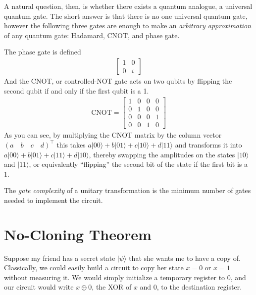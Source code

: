 \documentclass[12pt,twoside]{reedthesis}
\newcommand{\ket}[1]{\ensuremath{\lvert #1\rangle}\xspace}
\begin{document}
A natural question, then, is whether there exists a quantum analogue, a universal quantum gate. The short answer is that there is no one universal quantum gate, however the following three gates are enough to make an \textit{arbitrary approximation} of any quantum gate: Hadamard, CNOT, and phase gate. 

The phase gate is defined
\begin{align}
\begin{bmatrix}
1 & 0\\
0 & i 
\end{bmatrix}
\end{align}
And the CNOT, or controlled-NOT gate acts on two qubits by flipping the second qubit if and only if the first qubit is a 1. 
\begin{align}
\text{CNOT} = \begin{bmatrix}
1 & 0 & 0 & 0 \\
0 & 1 & 0 & 0 \\
0 & 0 & 0 & 1 \\
0 & 0 & 1 & 0
\end{bmatrix}
\end{align}
As you can see, by multiplying the CNOT matrix by the column vector $(a\quad b\quad c\quad d)^\intercal$ this takes $a\ket{00} + b\ket{01} + c\ket{10} + d\ket{11}$ and transforms it into $a\ket{00} + b\ket{01} + c\ket{11} + d\ket{10}$, thereby swapping the amplitudes on the states $\ket{10}$ and $\ket{11}$, or equivalently ``flipping'' the second bit of the state if the first bit is a 1. 

The \textit{gate complexity} of a unitary transformation is the minimum number of gates needed to implement the circuit. 

\section{No-Cloning Theorem}

Suppose my friend has a secret state \ket{\psi} that she wants me to have a copy of.  Classically, we could easily build a circuit to copy her state $x = 0$ or $x = 1$ without measuring it. We would simply initialize a temporary register to 0, and our circuit would write $x \oplus 0$, the XOR of $x$ and 0, to the destination register. 
\end{document}
